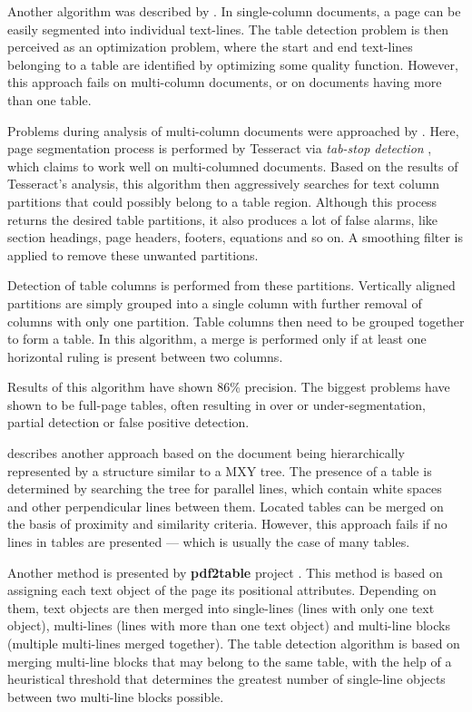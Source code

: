 Another algorithm was described by \citet{MediumTable}. In single-column documents, a page can be easily segmented into individual text-lines. The table detection problem is then perceived as an optimization problem, where the start and end text-lines belonging to a table are identified by optimizing some quality function. However, this approach fails on multi-column documents, or on documents having more than one table.

Problems during analysis of multi-column documents were approached by \citet{tableDetHeterogeneous}. Here, page segmentation process is performed by Tesseract via \emph{tab-stop detection} , which claims to work well on multi-columned documents. Based on the results of Tesseract's analysis, this algorithm then aggressively searches for text column partitions that could possibly belong to a table region. Although this process returns the desired table partitions, it also produces a lot of false alarms, like section headings, page headers, footers, equations and so on. A smoothing filter is applied to remove these unwanted partitions.

Detection of table columns is performed from these partitions. Vertically aligned partitions are simply grouped into a single column with further removal of columns with only one partition. Table columns then need to be grouped together to form a table. In this algorithm, a merge is performed only if at least one horizontal ruling is present between two columns.

Results of this algorithm have shown 86\% precision. The biggest problems have shown to be full-page tables, often resulting in over or under-segmentation, partial detection or false positive detection. 

\citet{tableDetectCesarini} describes another approach based on the document being hierarchically represented by a structure similar to a MXY tree. The presence of a table is determined by searching the tree for parallel lines, which contain white spaces and other perpendicular lines between them. Located tables can be merged on the basis of proximity and similarity criteria. However, this approach fails if no lines in tables are presented --- which is usually the case of many tables.

Another method is presented by \textbf{pdf2table} project \cite{pdf2table}. This method is based on assigning each text object of the page its positional attributes. Depending on them, text objects are then merged into single-lines (lines with only one text object), multi-lines (lines with more than one text object) and multi-line blocks (multiple multi-lines merged together). The table detection algorithm is based on merging multi-line blocks that may belong to the same table, with the help of a heuristical threshold that determines the greatest number of single-line objects between two multi-line blocks possible.

